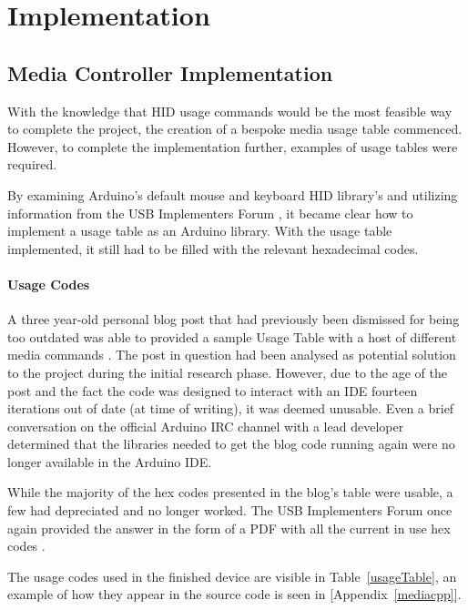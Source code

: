 \documentclass{article}
\begin{document}
	\section{Implementation}
		\subsection{Media Controller Implementation}
			With the knowledge that HID usage commands would be the most feasible way to complete the project, the creation of a bespoke media usage table commenced. However, to complete the implementation further, examples of usage tables were required.
			
			By examining Arduino's default mouse and keyboard HID library's \cite{ArduinoGit:online} and utilizing information from the USB Implementers Forum \cite{USBHID:online}, it became clear how to implement a usage table as an Arduino library. With the usage table implemented, it still had to be filled with the relevant hexadecimal codes.
				
			\paragraph{Usage Codes}
			A three year-old personal blog post that had previously been dismissed for being too outdated was able to provided a sample Usage Table with a host of different media commands \cite{MediaBlog:online}. The post in question had been analysed as potential solution to the project during the initial research phase. However, due to the age of the post and the fact the code was designed to interact with an IDE fourteen iterations out of date (at time of writing), it was deemed unusable. Even a brief conversation on the official Arduino IRC channel with a lead developer determined that the libraries needed to get the blog code running again were no longer available in the Arduino IDE.
					
			While the majority of the hex codes presented in the blog's table were usable, a few had depreciated and no longer worked. The USB Implementers Forum once again provided the answer in the form of a PDF with all the current in use hex codes \cite{HIDUsagePage:online}.
			
			The usage codes used in the finished device are visible in Table~\ref{usageTable}, an example of how they appear in the source code is seen in [Appendix~\ref{mediacpp}]. 
			
\end{document}
